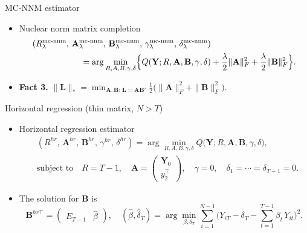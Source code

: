 \documentclass[xcolor=svgnames,aspectratio=169]{beamer}
\begin{document}
\begin{frame}{MC-NNM estimator}
    \begin{itemize}
        \item Nuclear norm matrix completion
        \begin{align*}
        (R_\lambda^{\mathrm{mc\text{-}nnm}},\,
         \mathbf{A}_\lambda^{\mathrm{mc\text{-}nnm}},\,
         \mathbf{B}_\lambda^{\mathrm{mc\text{-}nnm}},\,
         \gamma_\lambda^{\mathrm{mc\text{-}nnm}},\,
         \delta_\lambda^{\mathrm{mc\text{-}nnm}})& \\
        = \arg\min_{R,A,B,\gamma,\delta}
           \Bigl\{Q(\mathbf{Y};R,\mathbf{A},\mathbf{B},\gamma,\delta)
        &+\frac{\lambda}{2}\|\mathbf{A}\|_F^2
           +\frac{\lambda}{2}\|\mathbf{B}\|_F^2\Bigr\}.
        \end{align*}
        \item \textbf{Fact 3.} $\|\mathbf{L}\|_*
        = \min_{\mathbf{A},\mathbf{B}:\,\mathbf{L}=\mathbf{A}\mathbf{B}'}
          \frac{1}{2}\bigl(\|\mathbf{A}\|_F^2 + \|\mathbf{B}\|_F^2\bigr).$
  \end{itemize}
\end{frame}

\begin{frame}{Horizontal regression (thin matrix, $N>T$)}
  \begin{itemize}
    \item Horizontal regression estimator
      \begin{align*}
        &(R^{hr},\,\mathbf{A}^{hr},\,\mathbf{B}^{hr},\,\gamma^{hr},\,\delta^{hr})
        = \arg\min_{R,A,B,\gamma,\delta}
           Q\bigl(\mathbf{Y};R,\mathbf{A},\mathbf{B},\gamma,\delta\bigr),\\
        &\text{subject to}\quad
        R = T-1,\quad
        \mathbf{A} = \begin{pmatrix}\mathbf{Y}_0 \\ y_2^\top\end{pmatrix},\quad
        \gamma = 0,\quad
        \delta_1 = \cdots = \delta_{T-1} = 0.
      \end{align*}
    \item The solution for $\mathbf{B}$ is
    \[
      \mathbf{B}^{hr\top}
      = \begin{pmatrix} E_{T-1} & \hat\beta \end{pmatrix},
      \quad
      (\hat\beta,\hat\delta_T)
      = \arg\min_{\beta,\delta_T}
        \sum_{i=1}^{N-1}
        \bigl(Y_{iT} - \delta_T - \sum_{t=1}^{T-1}\beta_t\,Y_{it}\bigr)^2.
    \]
  \end{itemize}
\end{frame}
\end{document}
